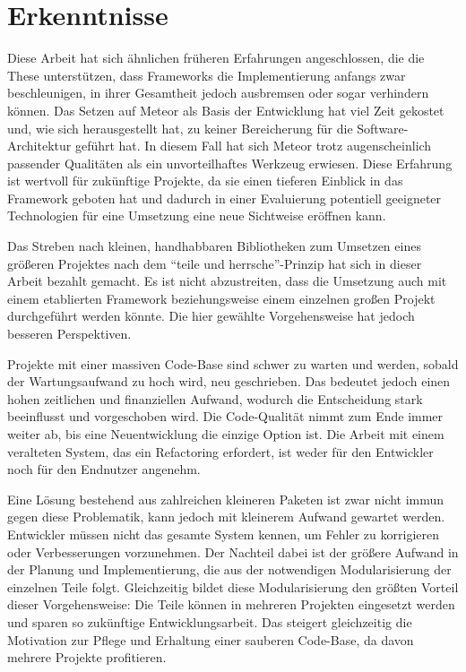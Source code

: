 \section{Erkenntnisse}
\label{sec:d_erkenntnisse}

Diese Arbeit hat sich ähnlichen früheren Erfahrungen angeschlossen, die die
These unterstützen, dass Frameworks die Implementierung anfangs zwar
beschleunigen, in ihrer Gesamtheit jedoch ausbremsen oder sogar verhindern können.
Das Setzen auf Meteor als Basis der Entwicklung hat viel Zeit gekostet und, wie
sich herausgestellt hat, zu keiner Bereicherung für die Software-Architektur
geführt hat.  In diesem Fall hat sich Meteor trotz augenscheinlich passender
Qualitäten als ein unvorteilhaftes Werkzeug erwiesen.  Diese Erfahrung ist
wertvoll für zukünftige Projekte, da sie einen tieferen Einblick in das
Framework geboten hat und dadurch in einer Evaluierung potentiell geeigneter
Technologien für eine Umsetzung eine neue Sichtweise eröffnen kann.

Das Streben nach kleinen, handhabbaren Bibliotheken zum Umsetzen eines größeren
Projektes nach dem \enquote{teile und herrsche}-Prinzip hat sich in dieser
Arbeit bezahlt gemacht.  Es ist nicht abzustreiten, dass die Umsetzung auch mit
einem etablierten Framework beziehungsweise einem einzelnen großen Projekt
durchgeführt werden könnte.  Die hier gewählte Vorgehensweise hat jedoch
besseren Perspektiven.

Projekte mit einer massiven Code-Base sind schwer zu warten und werden, sobald
der Wartungsaufwand zu hoch wird, neu geschrieben.  Das bedeutet jedoch einen
hohen zeitlichen und finanziellen Aufwand, wodurch die Entscheidung stark
beeinflusst und vorgeschoben wird.  Die Code-Qualität nimmt zum Ende immer
weiter ab, bis eine Neuentwicklung die einzige Option ist.  Die Arbeit mit
einem veralteten System, das ein Refactoring erfordert, ist weder für den
Entwickler noch für den Endnutzer angenehm.

Eine Lösung bestehend aus zahlreichen kleineren Paketen ist zwar nicht immun
gegen diese Problematik, kann jedoch mit kleinerem Aufwand gewartet werden.
Entwickler müssen nicht das gesamte System kennen, um Fehler zu korrigieren
oder Verbesserungen vorzunehmen.  Der Nachteil dabei ist der größere Aufwand 
in der Planung und Implementierung, die aus der notwendigen Modularisierung der
einzelnen Teile folgt.  Gleichzeitig bildet diese Modularisierung
den größten Vorteil dieser Vorgehensweise:  Die Teile können in mehreren
Projekten eingesetzt werden und sparen so zukünftige Entwicklungsarbeit.
Das steigert gleichzeitig die Motivation zur Pflege und Erhaltung einer
sauberen Code-Base, da davon mehrere Projekte profitieren.

